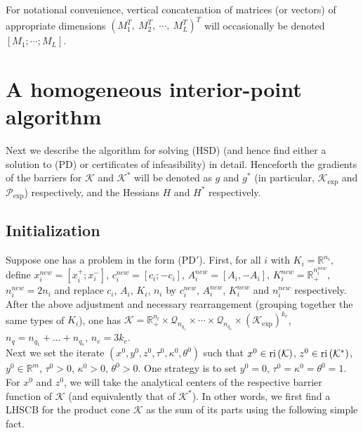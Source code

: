 \documentclass[10pt]{article}
\theoremstyle{definition}
\theoremstyle{plain}
\def\interior{\protect{\textnormal{ri}}}
\begin{document}
For notational convenience, vertical concatenation of matrices (or vectors) of appropriate dimensions $(M_1^T,\ M_2^T,\ \cdots,\ M_L^T)^T$ will occasionally be denoted $[M_1; \cdots ; M_L]$.

\section{A homogeneous interior-point algorithm}
Next we describe the algorithm for solving (HSD) (and hence find either a solution to (PD) or certificates of infeasibility) in detail. Henceforth the gradients of the barriers for $\mathcal{K}$ and $\mathcal{K}^*$ will be denoted as $g$ and $g^*$ (in particular, $\mathcal{K}_{\exp}$ and $\mathcal{P}_{\exp}$) respectively, and the Hessians $H$ and $H^*$ respectively.
\subsection{Initialization}

Suppose one has a problem in the form (PD$'$). First, for all $i$ with $K_i = \mathbb{R}^{n_i}$, define $x_i^{new} = [x_i^+; x_i^-]$, $c_i^{new} = [c_i; -c_i]$, $A_i^{new} = [A_i, -A_i]$, $K_i^{new} = \mathbb{R}_+^{n_i^{new}}$, $n_i^{new} = 2n_i$ and replace $c_i$, $A_i$, $K_i$, $n_i$ by $c_i^{new}$, $A_i^{new}$, $K_i^{new}$ and $n_i^{new}$ respectively. After the above adjustment and necessary rearrangement (grouping together the same types of $K_i$), one has $\mathcal{K} = \mathbb{R}_+^{n_l} \times \mathcal{Q}_{n_{q_1}} \times \cdots \times \mathcal{Q}_{n_{q_s}} \times \left(\mathcal{K}_{\exp}\right)^{k_e}$, $n_q = n_{q_1} + ... + n_{q_s}$, $n_e = 3k_e$. \\

Next we set the iterate $(x^0,y^0, z^0, \tau^0, \kappa^0, \theta^0)$ such that $x^0 \in \interior\left(\mathcal{K}\right)$, $z^0 \in \interior\left(\mathcal{K}^*\right)$, $y^0 \in \mathbb{R}^m$, $\tau^0 > 0$, $\kappa^0 > 0$, $\theta^0>0$. One strategy is to set $y^0 = 0$, $\tau^0 = \kappa^0 = \theta^0 = 1$. For $x^0$ and $z^0$, we will take the analytical centers of the respective barrier function of $\mathcal{K}$ (and equivalently that of $\mathcal{K}^*$). In other words, we first find a LHSCB for the product cone $\mathcal{K}$ as the sum of its parts using the following simple fact.
\end{document}

